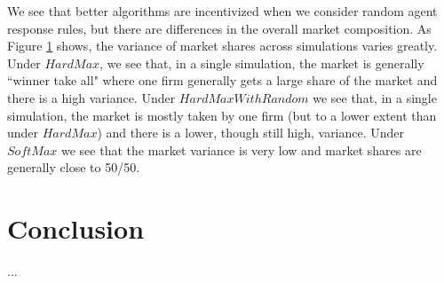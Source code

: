 \documentclass{article}
\theoremstyle{definition}
\begin{document}
\begin{figure}
\label{agent_variances}
\end{figure}

We see that better algorithms are incentivized when we consider random agent response rules, but there are differences in the overall market composition. As Figure \ref{agent_variances} shows, the variance of market shares across simulations varies greatly. Under $HardMax$, we see that, in a single simulation, the market is generally ``winner take all" where one firm generally gets a large share of the market and there is a high variance. Under $HardMaxWithRandom$ we see that, in a single simulation, the market is mostly taken by one firm (but to a lower extent than under $HardMax$) and there is a lower, though still high, variance. Under $SoftMax$ we see that the market variance is very low and market shares are generally close to 50/50.

\section{Conclusion}
\label{S:10}

...

\pagebreak

\end{document}
